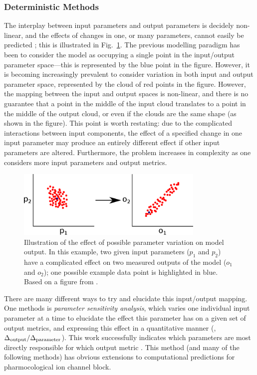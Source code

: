 \documentclass[../thesis-main.tex]{subfiles}
\begin{document}
\subsubsection{Deterministic Methods}
\label{subsubsec:deterministic}
The interplay between input parameters and output parameters is decidely non-linear, and the effects of changes in one, or many parameters, cannot easily be predicted \citep{Sarkar2012}; this is illustrated in Fig.~\ref{fig:param-var-effect}. The previous modelling paradigm has been to consider the model as occupying a single point in the input/output parameter space---this is represented by the blue point in the figure. However, it is becoming increasingly prevalent to consider variation in both input and output parameter space, represented by the cloud of red points in the figure. However, the mapping between the input and output spaces is non-linear, and there is no guarantee that a point in the middle of the input cloud translates to a point in the middle of the output cloud, or even if the clouds are the same shape (as shown in the figure). This point is worth restating: due to the complicated interactions between input components, the effect of a specified change in one input parameter may produce an entirely different effect if other input parameters are altered. Furthermore, the problem increases in complexity as one considers more input parameters and output metrics.
\begin{figure}
 \centering
 \includegraphics[width=0.8\textwidth]{param-var-effect}
 \caption[Effect of parameter variation on model output.]{Illustration of the effect of possible parameter variation on model output. In this example, two given input parameters ($p_1$ and $p_2$) have a complicated effect on two measured outputs of the model ($o_1$ and $o_2$); one possible example data point is highlighted in blue. Based on a figure from \citet{Sarkar2012}.}
 \label{fig:param-var-effect}
\end{figure}

There are many different ways to try and elucidate this input/output mapping. One methods is \emph{parameter sensitivity analysis}, which varies one individual input parameter at a time to elucidate the effect this parameter has on a given set of output metrics, and expressing this effect in a quantitative manner (\eg{}, $\Delta_\textnormal{output}/\Delta_\textnormal{parameter}$). This work successfully indicates which parameters are most directly responsible for which output metric \citep{Nygren1998, Romero2009, Romero2010, Corrias2011, Romero2011}. This method (and many of the following methods) has obvious extensions to computational predictions for pharmocological ion channel block.
\end{document}
